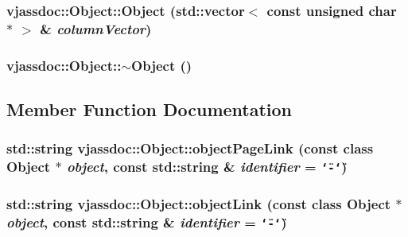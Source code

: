 \hypertarget{classvjassdoc_1_1Object_2e185664aec8264f2fe55500768dc77f}{
\subsubsection{\setlength{\rightskip}{0pt plus 5cm}vjassdoc::Object::Object (std::vector$<$ const unsigned char $\ast$ $>$ \& {\em columnVector})}}
\label{classvjassdoc_1_1Object_2e185664aec8264f2fe55500768dc77f}


\hypertarget{classvjassdoc_1_1Object_ee368858fe1d3723b95600c12a474b38}{
\subsubsection{\setlength{\rightskip}{0pt plus 5cm}vjassdoc::Object::$\sim$Object ()}}
\label{classvjassdoc_1_1Object_ee368858fe1d3723b95600c12a474b38}




\subsection{Member Function Documentation}
\hypertarget{classvjassdoc_1_1Object_1e7cc8e9b75c8555f996ecd9af27e446}{
\subsubsection{\setlength{\rightskip}{0pt plus 5cm}std::string vjassdoc::Object::objectPageLink (const class {\bf Object} $\ast$ {\em object}, const std::string \& {\em identifier} = {\tt \char`\"{}-\char`\"{}})}}
\label{classvjassdoc_1_1Object_1e7cc8e9b75c8555f996ecd9af27e446}


\hypertarget{classvjassdoc_1_1Object_0f115e83ce406e04b8ff20bacfb4acab}{
\subsubsection{\setlength{\rightskip}{0pt plus 5cm}std::string vjassdoc::Object::objectLink (const class {\bf Object} $\ast$ {\em object}, const std::string \& {\em identifier} = {\tt \char`\"{}-\char`\"{}})}}
\label{classvjassdoc_1_1Object_0f115e83ce406e04b8ff20bacfb4acab}


